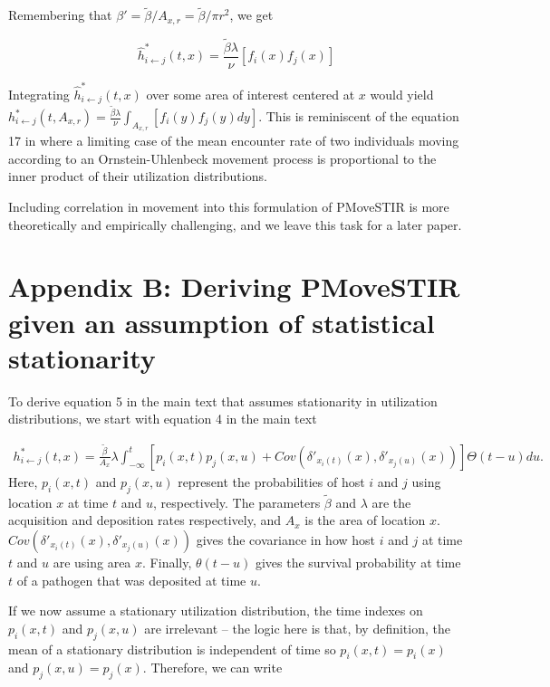 \documentclass[11pt]{article}
\begin{document}
Remembering that $\beta' = \tilde{\beta} / A_{x, r} = \tilde{\beta} / \pi r^2$, we get 

\begin{equation}
    \hat{h}^*_{i \leftarrow j}(t, x) =  \frac{\tilde{\beta} \lambda}{\nu} [f_i(x) f_j(x)]
\end{equation}

Integrating $\hat{h}^*_{i \leftarrow j}(t, x)$ over some area of interest centered at $x$ would yield  $h^*_{i \leftarrow j}(t, A_{x, r}) = \frac{\tilde{\beta} \lambda}{\nu} \int_{A_{x, r}} [f_i(y) f_j(y) dy] $. This is reminiscent of the equation 17 in \cite{Martinez-Garcia2020} where a limiting case of the mean encounter rate of two individuals moving according to an Ornstein-Uhlenbeck movement process is proportional to the inner product of their utilization distributions. 

Including correlation in movement into this formulation of PMoveSTIR is more theoretically and empirically challenging, and we leave this task for a later paper.

\section*{Appendix B: Deriving PMoveSTIR given an assumption of statistical stationarity}

To derive equation 5 in the main text that assumes stationarity in utilization distributions, we start with equation 4 in the main text

\begin{equation}
    \begin{aligned}
        h^*_{i \leftarrow j}(t, x) = \frac{\tilde{\beta}}{A_x} \lambda \int_{-\infty}^{t} [p_i(x, t) p_j(x, u) + Cov(\delta'_{x_i(t)}(x), \delta'_{x_j(u)}(x))] \Theta(t - u) du.
    \end{aligned}
    \label{eq:foi_cov}
\end{equation}
Here, $p_i(x, t)$ and $p_j(x, u)$ represent the probabilities of host $i$ and $j$ using location $x$ at time $t$ and $u$, respectively. The parameters $\tilde{\beta}$ and $\lambda$ are the acquisition and deposition rates respectively, and $A_x$ is the area of location $x$.  $Cov(\delta'_{x_i(t)}(x), \delta'_{x_j(u)}(x))$ gives the covariance in how host $i$ and $j$ at time $t$ and $u$ are using area $x$.  Finally, $\theta(t - u)$  gives the survival probability at time $t$ of a pathogen that was deposited at time $u$. 

If we now assume a stationary utilization distribution, the time indexes on $p_i(x, t)$ and $p_j(x, u)$ are irrelevant -- the logic here is that, by definition, the mean of a stationary distribution is independent of time so $p_i(x, t) = p_i(x)$ and $p_j(x, u) = p_j(x)$. Therefore, we can write  
\end{document}
